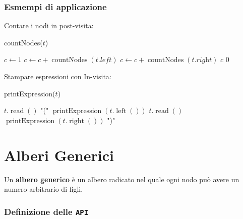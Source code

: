         \subsubsection{Esmempi di applicazione}
            Contare i nodi in post-visita:
            \begin{algorithm}[H]
                \caption{countNodes(\Tree $t$)}
                \begin{algorithmic}
                        \State $c \gets 1$
                        \State $c \gets c + \operatorname{countNodes}(t.\textit{left})$
                        \State $c \gets c + \operatorname{countNodes}(t.\textit{right})$
                        \State \Return $c$
                    \Else
                        \State \Return $0$
                    \EndIf
                \end{algorithmic}
            \end{algorithm}
            Stampare espressioni con In-visita:
            \begin{algorithm}[H]
                \caption{\Int printExpression(\Tree $t$)}
                \begin{algorithmic}
                        \State \Print $t.\operatorname{read}()$
                    \Else
                        \State \Print "("
                        \State \Print $\operatorname{printExpression}(t.\operatorname{left}())$
                        \State \Print $t.\operatorname{read}()$
                        \State \Print $\operatorname{printExpression}(t.\operatorname{right}())$
                        \State \Print ")"
                    \EndIf
                \end{algorithmic}
            \end{algorithm}
\section{Alberi Generici}
    \begin{definition}
        Un \textbf{albero generico} è un albero radicato nel quale ogni nodo può avere un numero arbitrario di figli.
    \end{definition}
    \subsubsection{Definizione delle \texttt{API}}
    
